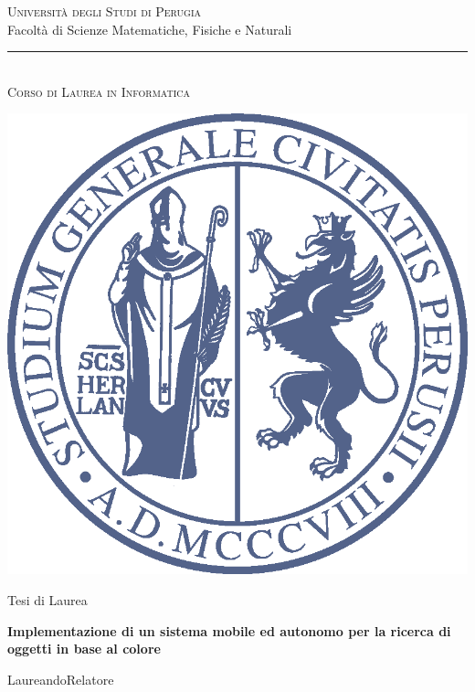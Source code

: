 \documentclass[a4paper,12pt]{report}
\title{\begin{large}\textbf{\titolotesi}\end{large}}
\author{\laureando}
\def\titolotesi{Implementazione di un sistema mobile ed autonomo per la ricerca di oggetti in base al colore} %
\begin{document}
\begin{titlepage}
\begin{center}
\textsc{\Large Universit\`a degli Studi di Perugia}\medskip\\

{\Large Facolt\`a di Scienze Matematiche, Fisiche e Naturali}\medskip\\

\rule{10mm}{0.01mm}\medskip\\

{\small \textsc{Corso di Laurea in Informatica}}\medskip\\

\vspace*{5mm}

\includegraphics[scale=0.2]{immagini/logo_unipg.png}

\Large Tesi di Laurea \par\bigskip

{\large \bf \titolotesi \par}

\bigskip\bigskip

\end{center}\par

\hspace{0.5cm}Laureando\hspace{7.3cm}Relatore\par


\end{titlepage}
\end{document}
